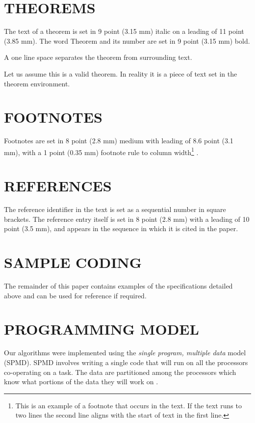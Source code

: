 \documentclass{ecai2014}
\begin{document}
\section{THEOREMS}
The text of a theorem is set in 9 point (3.15 mm) italic on a
leading of 11 point (3.85 mm). The word Theorem and its number
are set in 9 point (3.15 mm) bold.

A one line space separates the theorem from surrounding text.

\begin{theorem}
Let us assume this is a valid theorem. In reality it is a piece
of text set in the theorem environment.
\end{theorem}

\section{FOOTNOTES}
Footnotes are set in 8 point (2.8 mm) medium with leading of 8.6 point (3.1
mm), with a 1 point (0.35 mm) footnote rule to column
width\footnote{This is an example of a footnote that occurs in
the text. If the text runs to two lines the second line aligns
with the start of text in the first line.} .

\section{REFERENCES}
The reference identifier in the text is set as a sequential number in
square brackets. The reference entry itself is set in 8 point
(2.8 mm) with a leading of 10 point (3.5 mm), and appears
in the sequence in which it is cited in the paper.

\section{SAMPLE CODING}
The remainder of this paper contains examples of the specifications
detailed above and can be used for reference if required.

\section{PROGRAMMING MODEL}
\label{par}
Our algorithms were implemented using the \emph{single program,
  multiple data} model (SPMD). SPMD involves writing a single code
that will run on all the processors co-operating on a task. The data
are partitioned among the processors which know what portions of the
data they will work on \cite{kn:Golub89}.
\end{document}
